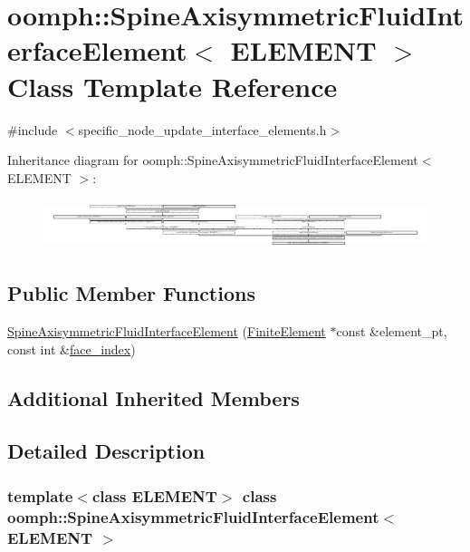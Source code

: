 \hypertarget{classoomph_1_1SpineAxisymmetricFluidInterfaceElement}{}\section{oomph\+:\+:Spine\+Axisymmetric\+Fluid\+Interface\+Element$<$ E\+L\+E\+M\+E\+NT $>$ Class Template Reference}
\label{classoomph_1_1SpineAxisymmetricFluidInterfaceElement}


{\ttfamily \#include $<$specific\+\_\+node\+\_\+update\+\_\+interface\+\_\+elements.\+h$>$}

Inheritance diagram for oomph\+:\+:Spine\+Axisymmetric\+Fluid\+Interface\+Element$<$ E\+L\+E\+M\+E\+NT $>$\+:\begin{figure}[H]
\begin{center}
\leavevmode
\includegraphics[height=1.454545cm]{classoomph_1_1SpineAxisymmetricFluidInterfaceElement}
\end{center}
\end{figure}
\subsection*{Public Member Functions}
\begin{DoxyCompactItemize}
\item 
\hyperlink{classoomph_1_1SpineAxisymmetricFluidInterfaceElement_a66aaa2581711338cf66660d97663d7cb}{Spine\+Axisymmetric\+Fluid\+Interface\+Element} (\hyperlink{classoomph_1_1FiniteElement}{Finite\+Element} $\ast$const \&element\+\_\+pt, const int \&\hyperlink{classoomph_1_1FaceElement_a478d577ac6db67ecc80f1f02ae3ab170}{face\+\_\+index})
\end{DoxyCompactItemize}
\subsection*{Additional Inherited Members}


\subsection{Detailed Description}
\subsubsection*{template$<$class E\+L\+E\+M\+E\+NT$>$\newline
class oomph\+::\+Spine\+Axisymmetric\+Fluid\+Interface\+Element$<$ E\+L\+E\+M\+E\+N\+T $>$}



